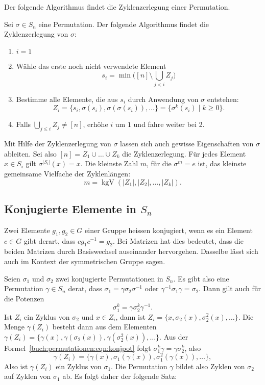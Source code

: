Der folgende Algorithmus findet die Zyklenzerlegung einer Permutation.

\begin{satz}
Sei $\sigma\in S_n$ eine Permutation. Der folgende Algorithmus findet
die Zyklenzerlegung von $\sigma$:
\begin{enumerate}
\item
$i=1$
\item
Wähle das erste noch nicht verwendete Element
\[
s_i=\min\biggl( [n] \setminus \bigcup_{j< i} Z_j\biggr)
\]
\item
Bestimme alle Elemente, die aus $s_i$ durch Anwendung von $\sigma$
entstehen:
\[
Z_i
=
\{ s_i, \sigma(s_i), \sigma(\sigma(s_i)), \dots \}
=
\{\sigma^k(s_i)\;|\; k\ge 0\}.
\]
\item
Falls $\bigcup_{j\le i} Z_j\ne [n]$, erhöhe $i$ um $1$ und fahre 
weiter bei 2.
\end{enumerate}
\end{satz}

Mit Hilfe der Zyklenzerlegung von $\sigma$ lassen sich auch
gewisse Eigenschaften von $\sigma$ ableiten.
Sei also $[n] = Z_1\cup\dots\cup Z_k$ die Zyklenzerlegung.
Für jedes Element $x\in S_i$ gilt $\sigma^{|S_i|}(x) = x$.
Die kleinste Zahl $m$, für die $\sigma^m=e$ ist, das kleinste
gemeinsame Vielfache der Zyklenlängen:
\[
m = \operatorname{kgV} (|Z_1|,|Z_2|,\dots,|Z_k|).
\]

\subsection{Konjugierte Elemente in $S_n$}
Zwei Elemente $g_1,g_2\in G$ einer Gruppe heissen konjugiert, wenn
es ein Element $c\in G$ gibt derart, dass $cg_1c^{-1}=g_2$.
Bei Matrizen hat dies bedeutet, dass die beiden Matrizen durch
Basiswechsel auseinander hervorgehen.
Dasselbe lässt sich auch im Kontext der symmetrischen Gruppe sagen.

Seien $\sigma_1$ und $\sigma_2$ zwei konjugierte Permutationen in $S_n$.
Es gibt also eine Permutation $\gamma\in S_n$ derat, dass
$\sigma_1=\gamma\sigma_2\sigma^{-1}$ oder $\gamma^{-1}\sigma_1\gamma=\sigma_2$.
Dann gilt auch für die Potenzen
\begin{equation}
\sigma_1^k = \gamma\sigma_2^k\gamma^{-1}.
\label{buch:permutationen:eqn:konjpot}
\end{equation}
Ist $Z_i$ ein Zyklus von $\sigma_2$ und $x\in Z_i$, dann ist
$Z_i = \{ x,\sigma_2(x),\sigma_2^2(x),\dots\}$.
Die Menge $\gamma(Z_i)$ besteht dann aus dem Elementen
$\gamma(Z_i)=\{\gamma(x),\gamma(\sigma_2(x)),\gamma(\sigma_2^2(x)),\dots\}$.
Aus der Formel~\eqref{buch:permutationen:eqn:konjpot} folgt
$\sigma_1^k\gamma = \gamma\sigma_2^k$, also
\[
\gamma(Z_i)
=
\{\gamma(x),\sigma_1(\gamma(x)),\sigma_1^2(\gamma(x)),\dots\},
\]
Also ist $\gamma(Z_i)$ ein Zyklus von $\sigma_1$.
Die Permutation $\gamma$ bildet also Zyklen von $\sigma_2$ auf Zyklen
von $\sigma_1$ ab.
Es folgt daher der folgende Satz:

